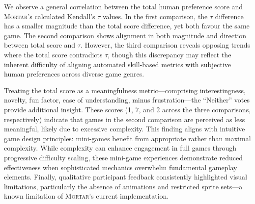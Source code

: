 \documentclass{article} %
\newcommand{\name}{\textsc{Mortar}}
\begin{document}
We observe a general correlation between the total human preference score and \name's calculated Kendall's $\tau$ values. In the first comparison, the $\tau$ difference has a smaller magnitude than the total score difference, yet both favour the same game. The second comparison shows alignment in both magnitude and direction between total score and $\tau$. However, the third comparison reveals opposing trends where the total score contradicts $\tau$, though this discrepancy may reflect the inherent difficulty of aligning automated skill-based metrics with subjective human preferences across diverse game genres.

Treating the total score as a meaningfulness metric---comprising interestingness, novelty, fun factor, ease of understanding, minus frustration---the ``Neither'' votes provide additional insight. These scores (1, 7, and 2 across the three comparisons, respectively) indicate that games in the second comparison are perceived as less meaningful, likely due to excessive complexity. This finding aligns with intuitive game design principles: mini-games benefit from appropriate rather than maximal complexity. While complexity can enhance engagement in full games through progressive difficulty scaling, these mini-game experiences demonstrate reduced effectiveness when sophisticated mechanics overwhelm fundamental gameplay elements.
Finally, qualitative participant feedback consistently highlighted visual limitations, particularly the absence of animations and restricted sprite sets---a known limitation of \name{}'s current implementation. 

\end{document}
